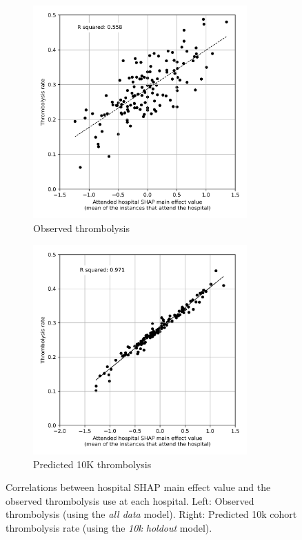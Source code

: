 \begin{figure}[!h]
\centering
\begin{subfigure}{.49\textwidth}
  \centering
    \caption*{\footnotesize{\textsf{Observed thrombolysis}}}
    \includegraphics[width=0.9\textwidth]{./images/03c_xgb_10_features_attended_hosp_shap_maineffect_vs_ivt_rate}
\end{subfigure}
\begin{subfigure}{.49\textwidth}
  \centering
    \caption*{\footnotesize{\textsf{Predicted 10K thrombolysis}}}
    \includegraphics[width=0.9\textwidth]{./images/04a_xgb_10_features_10k_cohort_attended_hosp_shap_maineffect_vs_ivt_rate}
\end{subfigure}

\caption{Correlations between hospital SHAP main effect value and the observed thrombolysis use at each hospital. Left: Observed thrombolysis (using the \emph{all data} model). Right: Predicted 10k cohort thrombolysis rate (using the \emph{10k holdout} model).}
\label{fig:shap_correlation}
\end{figure}


